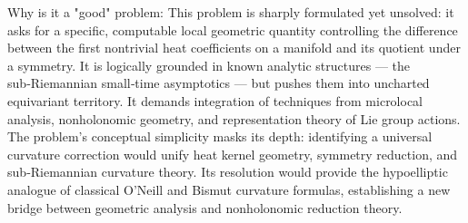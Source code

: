 Why is it a "good" problem:  
This problem is sharply formulated yet unsolved: it asks for a specific, computable local geometric quantity controlling the difference between the first nontrivial heat coefficients on a manifold and its quotient under a symmetry.  It is logically grounded in known analytic structures — the sub‑Riemannian small‑time asymptotics — but pushes them into uncharted equivariant territory.  It demands integration of techniques from microlocal analysis, nonholonomic geometry, and representation theory of Lie group actions.  The problem’s conceptual simplicity masks its depth: identifying a universal curvature correction would unify heat kernel geometry, symmetry reduction, and sub‑Riemannian curvature theory.  Its resolution would provide the hypoelliptic analogue of classical O’Neill and Bismut curvature formulas, establishing a new bridge between geometric analysis and nonholonomic reduction theory.